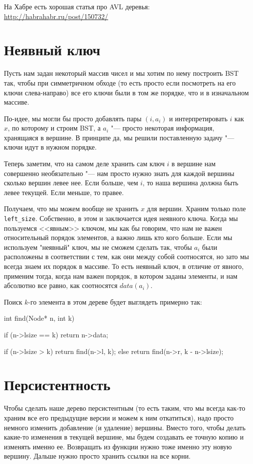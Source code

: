 На Хабре есть хорошая статья про AVL деревья:
\href{http://habrahabr.ru/post/150732/}{http://habrahabr.ru/post/150732/}

\section{Неявный ключ}

Пусть нам задан некоторый массив чисел и мы хотим по нему построить BST так, чтобы при симметричном обходе
(то есть просто если посмотреть на его ключи слева-направо) все его ключи были в том же порядке, что и в изначальном массиве.

По-идее, мы могли бы просто добавлять пары $(i, a_i)$ и интерпретировать $i$ как $x$, по которому и строим BST,
а $a_i$ "--- просто некоторая информация, хранящаяся в вершине.
В принципе да, мы решили поставленную задачу "--- ключи идут в нужном порядке.

Теперь заметим, что на самом деле хранить сам ключ $i$ в вершине нам совершенно необязательно "--- нам просто нужно знать для каждой
вершины сколько вершин левее нее. Если больше, чем $i$, то наша вершина должна быть левее текущей. Если меньше, то правее.

Получаем, что мы можем вообще не хранить $x$ для вершин. Храним только поле \verb'left_size'.
Собственно, в этом и заключается идея неявного ключа. Когда мы пользуемся <<явным>> ключом, мы как бы говорим,
что нам не важен относительный порядок элементов, а важно лишь кто кого больше.
Если мы используем "неявный" ключ, мы не сможем сделать так, чтобы $a_i$ были расположены в соответствии с тем,
как они между собой соотносятся, но зато мы всегда знаем их порядок в массиве.
То есть неявный ключ, в отличие от явного, применим тогда, когда нам важен порядок, в котором заданы элементы,
и нам абсолютно все равно, как соотносятся $data(a_i)$.

Поиск $k$-го элемента в этом дереве будет выглядеть примерно так:
\begin{cppcode}
int find(Node* n, int k) {
	if (n->lsize == k)
		return n->data;

		if (n->lsize > k)
			return find(n->l, k);
		else
			return find(n->r, k - n->lsize);
		}
\end{cppcode}

\section{Персистентность}

Чтобы сделать наше дерево персистентным (то есть таким, что мы всегда как-то храним все его предыдущие версии и можем к ним откатиться),
надо просто немного изменить добавление (и удаление) вершины.
Вместо того, чтобы делать какие-то изменения в текущей вершине, мы будем создавать ее точную копию и изменять именно ее.
Возвращать из функции нужно тоже именно эту новую вершину.
Дальше нужно просто хранить ссылки на все корни.

